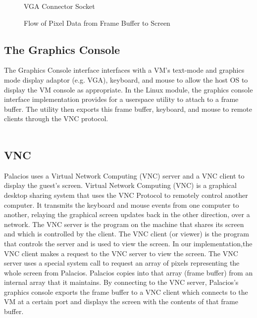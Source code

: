 \documentclass{acm_proc_article-sp}
\begin{document}
\begin{figure}                                              
\centering                                                     
{}                   
\caption{VGA Connector Socket}   
\end{figure} 

\begin{figure}                                              
\centering                                                     
{}                   
\caption{Flow of Pixel Data from Frame Buffer to Screen}   
\end{figure} 

\subsection{The Graphics Console} %
The Graphics Console interface interfaces with a VM's text-mode and graphics
mode display adaptor (e.g. VGA), keyboard, and mouse to allow the host OS to display the VM
console as appropriate. In the Linux module, the graphics console interface implementation provides
for a userspace utility to attach to a frame buffer. The utility then exports this frame buffer, keyboard,
and mouse to remote clients through the VNC protocol. \cite{techreport}
\\
\\
\subsection{VNC}
Palacios uses a Virtual Network Computing (VNC) server and a VNC client to
display the guest's screen. 
Virtual Network Computing (VNC) is a graphical desktop sharing system that uses the VNC Protocol to remotely control another computer. 
It transmits the keyboard and mouse events from one computer to another, relaying the graphical screen updates back in the other direction, over a network.
The VNC server is the program on the machine that shares its screen and which is controlled by the client.
The VNC client (or viewer) is the program that controls the server and is used to view the screen.
In our implementation,the VNC client makes a request to the VNC server to view the screen. 
The VNC server uses a special system call to request an array of pixels representing the whole screen from Palacios. 
Palacios copies into that array (frame buffer) from an internal array that it
maintains. By connecting to the VNC server, Palacios's graphics console exports
the frame buffer to a VNC client which connects to the VM at a certain port and
displays the screen with the contents of that frame buffer.
\end{document}
